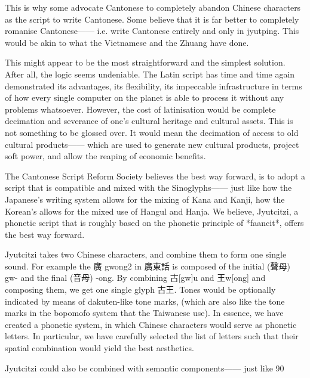 \documentclass[a5paper, 10pt, openany]{book} %
\begin{document}
This is why some advocate Cantonese to completely abandon Chinese characters as the script to write Cantonese. Some believe that it is far better to completely romanise Cantonese—— i.e. write Cantonese entirely and only in jyutping. This would be akin to what the Vietnamese and the Zhuang have done.

This might appear to be the most straightforward and the simplest solution. After all, the logic seems undeniable. The Latin script has time and time again demonstrated its advantages, its flexibility, its impeccable infrastructure in terms of how every single computer on the planet is able to process it without any problems whatsoever. However, the cost of latinisation would be complete decimation and severance of one’s cultural heritage and cultural assets. This is not something to be glossed over. It would mean the decimation of access to old cultural products—— which are used to generate new cultural products, project soft power, and allow the reaping of economic benefits.

The Cantonese Script Reform Society believes the best way forward, is to adopt a script that is compatible and mixed with the Sinoglyphs—— just like how the Japanese’s writing system allows for the mixing of Kana and Kanji, how the Korean’s allows for the mixed use of Hangul and Hanja. We believe, Jyutcitzi, a phonetic script that is roughly based on the phonetic principle of *faancit*, offers the best way forward.

Jyutcitzi takes two Chinese characters, and combine them to form one single sound. For example the 廣 gwong2 in 廣東話 is composed of the initial (聲母) gw- and the final (音母) -ong. By combining 古[gw]u and 王w[ong] and composing them, we get one single glyph 古王. Tones would be optionally indicated by means of dakuten-like tone marks, (which are also like the tone marks in the bopomofo system that the Taiwanese use). In essence, we have created a phonetic system, in which Chinese characters would serve as phonetic letters. In particular, we have carefully selected the list of letters such that their spatial combination would yield the best aesthetics.

Jyutcitzi could also be combined with semantic components—— just like 90%
\end{document}
